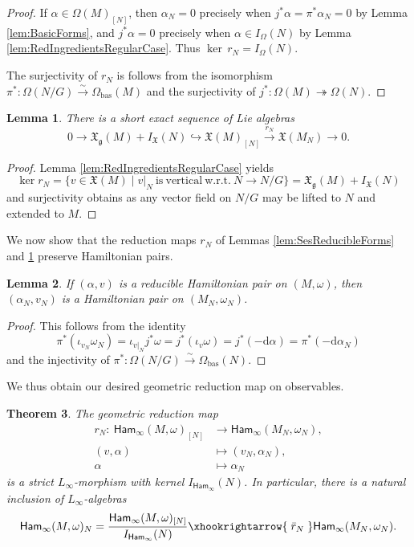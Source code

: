\documentclass[10pt,a4paper]{amsart}
\numberwithin{equation}{section}
\newtheorem{Theorem}{Theorem}[section]
\newtheorem{Lemma}[Theorem]{Lemma}
\newcommand{\g}{\mathfrak{g}}
\newcommand{\Ham}{\mathsf{Ham}}
\newcommand{\fgmodule}{\mathfrak{X}_{\g}}
\newcommand{\vanvf}{I_{\mathfrak{X}}(N)}%
\newcommand{\X}{\mathfrak{X}}
\renewcommand{\d}{\mathrm{d}}
\begin{document}
\begin{proof}
	If $\alpha\in\Omega(M)_{[N]}$, then $\alpha_N = 0$ precisely when $j^*\alpha=\pi^*\alpha_N=0$ by Lemma \ref{lem:BasicForms}, and $j^*\alpha=0$ precisely when $\alpha\in I_\Omega(N)$ by Lemma \ref{lem:RedIngredientsRegularCase}. Thus $\ker\,r_N= I_\Omega(N)$.

	The surjectivity of $r_N$ is follows from the isomorphism $\pi^*\colon \Omega(N/G)\xrightarrow{\sim}\Omega_{\mathrm{bas}}(M)$ and the surjectivity of $j^*\colon \Omega(M)\twoheadrightarrow\Omega(N)$.
\end{proof}

\begin{Lemma}\label{lem:SesReducibleFields}
	There is a short exact sequence of Lie algebras
	\[
		0\to\fgmodule(M)+\vanvf \hookrightarrow \X(M)_{[N]}\xrightarrow{r_N}\mathfrak X(M_N)\to 0.
	\]
\end{Lemma}

\begin{proof}
	Lemma \ref{lem:RedIngredientsRegularCase} yields
	\[
		\ker r_N = \{v\in\X(M) \mid v|_N \mathrm{~is~vertical~w.r.t.~}N\to N/G\} = \fgmodule(M)+\vanvf
	\]
	and surjectivity obtains as any vector field on $N/G$ may be lifted to $N$ and extended to $M$.
\end{proof}

We now show that the reduction maps $r_N$ of Lemmas \ref{lem:SesReducibleForms} and \ref{lem:SesReducibleFields} preserve Hamiltonian pairs.

\begin{Lemma}%
	If $(\alpha,v)$ is a reducible Hamiltonian pair on $(M,\omega)$, then $(\alpha_N,v_N)$ is a Hamiltonian pair on $(M_N,\omega_N)$.
\end{Lemma}

\begin{proof}
	This follows from the identity
	\[
		\pi^*(\iota_{v_N}\omega_N) = \iota_{v|_N} j^* \omega = j^*(\iota_v\omega) = j^*(-\d\alpha) = \pi^*(-\d\alpha_N)
	\]
	and the injectivity of $\pi^*\colon \Omega(N/G)\xrightarrow{\sim}\Omega_{\mathrm{bas}}(N)$.
\end{proof}

We thus obtain our desired geometric reduction map on observables.


\begin{Theorem}\label{thm:MultiSymRed_ManifoldvsObservables}
	The geometric reduction map
	\begin{align*}
		r_N\colon \	\Ham_\infty(M,\omega)_{[N]}	&\to		\Ham_\infty(M_N,\omega_N),		\\
			(v,\alpha) 			&\mapsto	 (v_N,\alpha_N)		,	\\
			\alpha 			&\mapsto	 \alpha_N
	\end{align*}
	is a strict $L_\infty$-morphism with kernel $I_{\Ham_\infty}(N)$. In particular, there is a natural inclusion of $L_\infty$-algebras
	\[
		\Ham_\infty(M,\omega)_N = \frac{\Ham_\infty(M,\omega)_{[N]}}{I_{\Ham_\infty}(N)} \xhookrightarrow{\;\bar{r}_N\;} \Ham_\infty(M_N,\omega_N).
	\]
\end{Theorem}
\end{document}
